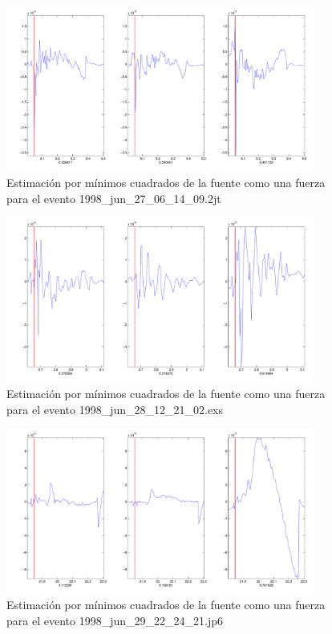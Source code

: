 \begin{figure}[H]
\includegraphics[width=0.9\textwidth,height=0.4\textheight]{linea_timerev/figuras/plotSrcEv10src.pdf}
\caption{Estimación por mínimos cuadrados de la fuente como una fuerza para el
evento 1998\_jun\_27\_06\_14\_09.2jt}
\end{figure}
\begin{figure}[H]
\includegraphics[width=0.9\textwidth,height=0.4\textheight]{linea_timerev/figuras/plotSrcEv11src.pdf}
\caption{Estimación por mínimos cuadrados de la fuente como una fuerza para el
evento 1998\_jun\_28\_12\_21\_02.exs}
\end{figure}
\begin{figure}[H]
\includegraphics[width=0.9\textwidth,height=0.4\textheight]{linea_timerev/figuras/plotSrcEv12src.pdf}
\caption{Estimación por mínimos cuadrados de la fuente como una fuerza para el
evento 1998\_jun\_29\_22\_24\_21.jp6}
\end{figure}
